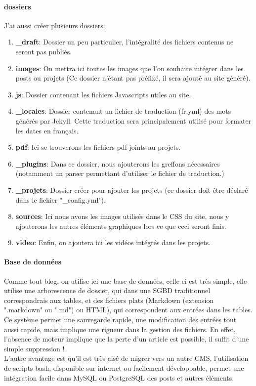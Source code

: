 \documentclass[11pt,a4paper,twoside]{report}
\begin{document}
			\paragraph{dossiers}J'ai aussi créer plusieurs dossiers:
				\begin{enumerate}
					\item \textbf{\_draft}:					Dossier un peu particulier, l'intégralité des fichiers contenus ne seront pas publiés.
					\item \textbf{images}:					On mettra ici toutes les images que l'on souhaite intégrer dans les posts ou projets (Ce dossier n'étant pas préfixé, il sera ajouté au site généré).
					\item \textbf{js}:						Dossier contenant les fichiers Javascripts utiles au site.
					\item \textbf{\_locales}:				Dossier contenant un fichier de traduction (fr.yml) des mots générés par Jekyll. Cette traduction sera principalement utilisé pour formater les dates en français.
					\item \textbf{pdf}:						Ici se trouverons les fichiers pdf joints au projets.
					\item \textbf{\_plugins}:				Dans ce dossier, nous ajouterons les greffons nécessaires (notamment un parser permettant d'utiliser le fichier de traduction.)
					\item \textbf{\_projets}:				Dossier créer pour ajouter les projets (ce dossier doit être déclaré dans le fichier "\_config.yml").
					\item \textbf{sources}:					Ici nous avons les images utilisés dans le CSS du site, nous y ajouterons les autres éléments graphiques lors ce que ceci seront finis.
					\item \textbf{video}:					Enfin, on ajoutera ici les vidéos intégrés dans les projets.
				\end{enumerate}
			\paragraph{Base de données}Comme tout blog, on utilise ici une base de données, celle-ci est très simple, elle utilise une arborescence de dossier, qui dans une SGBD traditionnel correspondrais aux tables, et des fichiers plats (Markdown (extension ".markdown" ou ".md") ou HTML), qui correspondent aux entrées dans les tables.\\
			Ce système permet une sauvegarde rapide, une modification des entrées tout aussi rapide, mais implique une rigueur dans la gestion des fichiers. En effet, l'absence de moteur implique que la perte d'un article est possible, il suffit d'une simple suppression !\\
			L'autre avantage est qu'il est très aisé de migrer vers un autre CMS, l'utilisation de scripts bash, disponible sur internet ou facilement développable, permet une intégration facile dans MySQL ou PostgreSQL des posts et autres éléments.
\end{document}
